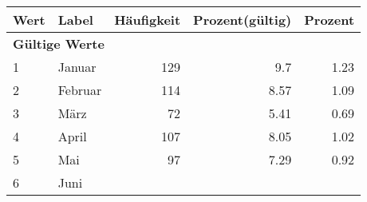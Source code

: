      \begin{longtable}{lXrrr}
     \toprule
     \textbf{Wert} & \textbf{Label} & \textbf{Häufigkeit} & \textbf{Prozent(gültig)} & \textbf{Prozent} \\
     \endhead
     \midrule
     \multicolumn{5}{l}{\textbf{Gültige Werte}}\\

     1 &
     \multicolumn{1}{X}{ Januar   } &


       \num{129} &
       \num[round-mode=places,round-precision=2]{9,7} &
         \num[round-mode=places,round-precision=2]{1,23} \\

     2 &
     \multicolumn{1}{X}{ Februar   } &


       \num{114} &
       \num[round-mode=places,round-precision=2]{8,57} &
         \num[round-mode=places,round-precision=2]{1,09} \\

     3 &
     \multicolumn{1}{X}{ März   } &


       \num{72} &
       \num[round-mode=places,round-precision=2]{5,41} &
         \num[round-mode=places,round-precision=2]{0,69} \\

     4 &
     \multicolumn{1}{X}{ April   } &


       \num{107} &
       \num[round-mode=places,round-precision=2]{8,05} &
         \num[round-mode=places,round-precision=2]{1,02} \\

     5 &
     \multicolumn{1}{X}{ Mai   } &


       \num{97} &
       \num[round-mode=places,round-precision=2]{7,29} &
         \num[round-mode=places,round-precision=2]{0,92} \\

     6 &
     \multicolumn{1}{X}{ Juni   } &



\end{longtable}
